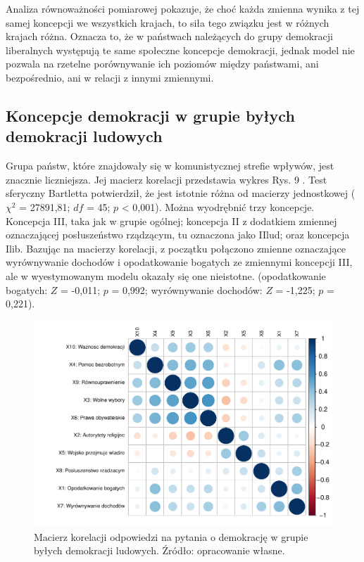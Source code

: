 \documentclass[12pt]{article}
\begin{document}
Analiza równoważności pomiarowej pokazuje, że choć każda zmienna wynika z tej samej koncepcji we wszystkich krajach, to siła tego związku jest w różnych krajach różna. Oznacza to, że w państwach należących do grupy demokracji liberalnych występują te same społeczne koncepcje demokracji, jednak model nie pozwala na rzetelne porównywanie ich poziomów między państwami, ani bezpośrednio, ani w relacji z innymi zmiennymi.

\hypertarget{koncepcje-demokracji-w-grupie-byux142ych-demokracji-ludowych}{%
\subsection{Koncepcje demokracji w grupie byłych demokracji ludowych}\label{koncepcje-demokracji-w-grupie-byux142ych-demokracji-ludowych}}

Grupa państw, które znajdowały się w komunistycznej strefie wpływów, jest znacznie liczniejsza. Jej macierz korelacji przedstawia wykres Rys. 9 . Test sferyczny Bartletta potwierdził, że jest istotnie różna od macierzy jednostkowej (\(\chi^2\) = 27891,81; \(df\) = 45; \(p\) \textless{} 0,001). Można wyodrębnić trzy koncepcje. Koncepcja III, taka jak w grupie ogólnej; koncepcja II z dodatkiem zmiennej oznaczającej posłuszeństwo rządzącym, tu oznaczona jako IIlud; oraz koncepcja Ilib. Bazując na macierzy korelacji, z początku połączono zmienne oznaczające wyrównywanie dochodów i opodatkowanie bogatych ze zmiennymi koncepcji III, ale w wyestymowanym modelu okazały się one nieistotne. (opodatkowanie bogatych: \(Z\) = -0,011; \(p\) = 0,992; wyrównywanie dochodów: \(Z\) = -1,225; \(p\) = 0,221).

\begin{figure}

\includegraphics{text_ASA_files/figure-latex/cor-matrix-east-1} \hfill{}

\caption{Macierz korelacji odpowiedzi na pytania o demokrację w grupie byłych demokracji ludowych. Źródło: opracowanie własne.}\label{fig:cor-matrix-east}
\end{figure}
\end{document}
